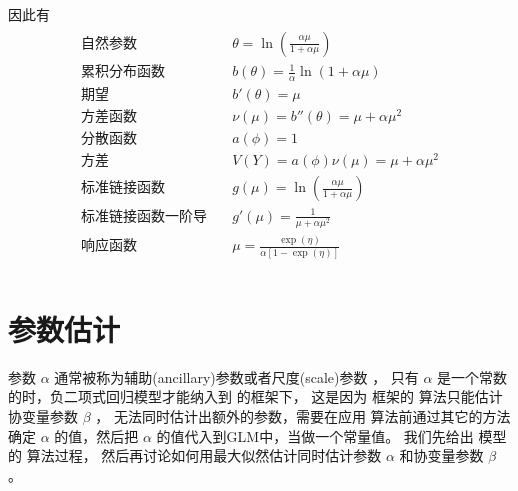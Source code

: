 \documentclass[letterpaper,10pt,english]{sphinxmanual}
\begin{document}
因此有
\begin{align}\label{equation:负二项模型/content:负二项模型/content:7}\!\begin{aligned}
\text{自然参数} & \quad \theta = \ln \left (\frac{\alpha \mu}{1+\alpha \mu} \right )\\
\text{累积分布函数} & \quad b(\theta) =  \frac{1}{\alpha} \ln (1+\alpha \mu)\\
\text{期望} & \quad b'(\theta) =  \mu\\
\text{方差函数} & \quad \nu(\mu) = b''(\theta) =  \mu + \alpha \mu^2\\
\text{分散函数} & \quad a(\phi) = 1\\
\text{方差} & \quad V(Y) =  a(\phi)\nu(\mu) = \mu + \alpha \mu^2\\
\text{标准链接函数} & \quad g(\mu) = \ln \left (\frac{\alpha \mu}{1+\alpha \mu} \right )\\
\text{标准链接函数一阶导}  & \quad g'(\mu) = \frac{1}{\mu+\alpha \mu^2}\\
\text{响应函数}  & \quad \mu = \frac{\exp(\eta)}{\alpha[1-\exp(\eta)] }\\
\end{aligned}\end{align}

\section{参数估计}
\label{\detokenize{_u8d1f_u4e8c_u9879_u6a21_u578b/content:id6}}
参数 \(\alpha\) 通常被称为辅助(ancillary)参数或者尺度(scale)参数
，
只有 \(\alpha\) 是一个常数的时，负二项式回归模型才能纳入到  的框架下，
这是因为  框架的  算法只能估计协变量参数 \(\beta\) ，
无法同时估计出额外的参数，需要在应用  算法前通过其它的方法确定
\(\alpha\) 的值，然后把 \(\alpha\) 的值代入到GLM中，当做一个常量值。
我们先给出  模型的  算法过程，
然后再讨论如何用最大似然估计同时估计参数 \(\alpha\)
和协变量参数 \(\beta\)
。
\end{document}
